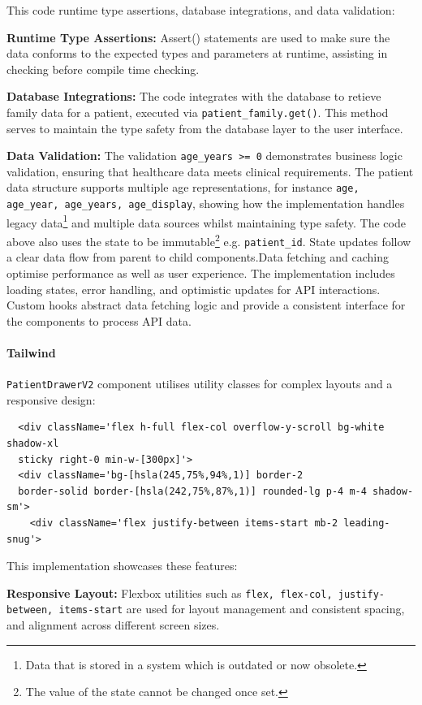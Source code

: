 This code runtime type assertions, database integrations, and data validation:

\textbf{Runtime Type Assertions:} Assert() statements are used to make sure the data conforms to the expected types and parameters at runtime, assisting in checking before compile time checking.

\textbf{Database Integrations:} The code integrates with the database to retieve family data for a patient, executed via \texttt{patient\_family.get()}. This method serves to maintain the type safety from the database layer to the user interface.

\textbf{Data Validation:} The validation \texttt{age\_years >= 0} demonstrates business logic validation, ensuring that healthcare data meets clinical requirements. The patient data structure supports multiple age representations, for instance \texttt{age, age\_year, age\_years, age\_display}, showing how the implementation handles legacy data\footnote{Data that is stored in a system which is outdated or now obsolete.} and multiple data sources whilst maintaining type safety. The code above also uses the state to be immutable\footnote{The value of the state cannot be changed once set.} e.g. \texttt{patient\_id}. State updates follow a clear data flow from parent to child components.Data fetching and caching optimise performance as well as user experience. The implementation includes loading states, error handling, and optimistic updates for API interactions. Custom hooks abstract data fetching logic and provide a consistent interface for the components to process API data.

\paragraph{Tailwind}\mbox{}

\texttt{PatientDrawerV2} component utilises utility classes for complex layouts and a responsive design:

\begin{verbatim}
  <div className='flex h-full flex-col overflow-y-scroll bg-white shadow-xl
  sticky right-0 min-w-[300px]'>
  <div className='bg-[hsla(245,75%,94%,1)] border-2
  border-solid border-[hsla(242,75%,87%,1)] rounded-lg p-4 m-4 shadow-sm'>
    <div className='flex justify-between items-start mb-2 leading-snug'>
\end{verbatim}

This implementation showcases these features:

\textbf{Responsive Layout:} Flexbox utilities such as \texttt{flex, flex-col,
justify-between, items-start}  are used for layout management and consistent spacing, and alignment across different screen sizes.

